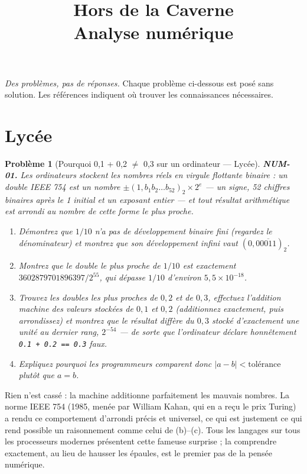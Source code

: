 \documentclass[11pt]{article}
\title{Hors de la Caverne \\ \Large Analyse numérique}
\author{}
\date{}
\newtheorem{problem}{Problème}
\begin{document}
\maketitle
\noindent\emph{Des problèmes, pas de réponses.} Chaque problème ci-dessous est posé
sans solution. Les références indiquent où trouver les connaissances nécessaires.
\medskip


\section*{Lycée}

\begin{problem}[{Pourquoi 0,1 + 0,2 $\ne$ 0,3 sur un ordinateur --- Lycée}]
\textbf{NUM-01.} Les ordinateurs stockent les nombres réels en virgule
flottante binaire : un \og{} double \fg{} IEEE 754 est un nombre
$\pm(1{,}b_1 b_2 \ldots b_{52})_2 \times 2^{e}$ --- un signe, 52 chiffres binaires après
le 1 initial et un exposant entier --- et tout résultat arithmétique est arrondi au
nombre de cette forme le plus proche.
\begin{enumerate}
\item[(a)] Démontrez que $1/10$ n'a pas de développement binaire fini
(regardez le dénominateur) et montrez que son développement infini vaut
$(0{,}0\overline{0011})_2$.
\item[(b)] Montrez que le double le plus proche de $1/10$ est exactement
$3602879701896397/2^{55}$, qui dépasse $1/10$ d'environ $5{,}5 \times 10^{-18}$.
\item[(c)] Trouvez les doubles les plus proches de $0{,}2$ et de $0{,}3$, effectuez l'addition
machine des valeurs stockées de $0{,}1$ et $0{,}2$ (additionnez exactement, puis
arrondissez) et montrez que le résultat diffère du $0{,}3$ stocké d'exactement une
unité au dernier rang, $2^{-54}$ --- de sorte que l'ordinateur déclare honnêtement
\texttt{0.1 + 0.2 == 0.3} faux.
\item[(d)] Expliquez pourquoi les programmeurs comparent donc
$|a - b| < \text{tolérance}$ plutôt que $a = b$.
\end{enumerate}

\end{problem}

\noindent Rien n'est cassé : la machine additionne parfaitement les mauvais
nombres. La norme IEEE 754 (1985, menée par William Kahan, qui en a reçu le prix
Turing) a rendu ce comportement d'arrondi précis et universel, ce qui est justement
ce qui rend possible un raisonnement comme celui de (b)--(c). Tous les langages sur
tous les processeurs modernes présentent cette fameuse surprise ; la comprendre
exactement, au lieu de hausser les épaules, est le premier pas de la pensée
numérique.
\end{document}
